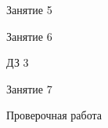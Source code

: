 \begin{class}[number=5]
	\begin{listofex}
		\item Занятие 5
	\end{listofex}
\end{class}

\begin{class}[number=6]
	\begin{listofex}
		\item Занятие 6
	\end{listofex}
\end{class}

\begin{homework}[number=3]
	\begin{listofex}
		\item ДЗ 3
	\end{listofex}
\end{homework}

\begin{class}[number=7]
	\begin{listofex}
		\item Занятие 7
	\end{listofex}
\end{class}

\begin{exam}
	\begin{listofex}
		\item Проверочная работа
	\end{listofex}
\end{exam}
